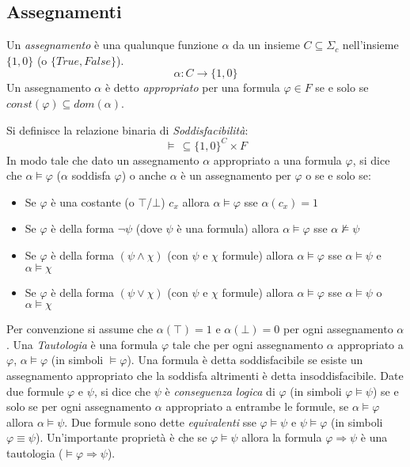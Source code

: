\documentclass[./main.tex]{subfiles}
\begin{document}



\subsection{Assegnamenti}

Un \textit{assegnamento} è una qualunque funzione $\alpha$ da un 
insieme $C \subseteq \Sigma_c$ nell'insieme $\{1, 0\}$ (o $\{True, False\}$).
$$ \alpha : C \rightarrow \{1, 0\} $$
Un assegnamento $\alpha$ è detto \textit{appropriato}  per una formula $\varphi \in F$ se e solo se $const(\varphi) \subseteq dom(\alpha)$.

Si definisce la relazione binaria di \textit{Soddisfacibilità}: 
$$\models \, \subseteq \{1, 0\}^{C} \times F$$
In modo tale che dato un assegnamento $\alpha$ appropriato a una formula $\varphi$, si dice che $\alpha \models \varphi$ ($\alpha$ soddisfa $\varphi$) 
o anche $\alpha$ è un assegnamento per $\varphi$ o  se e solo se:

\begin{itemize}
  \item Se $\varphi$ è una costante (o $\top$/$\bot$) $c_x$ allora $\alpha \models \varphi$ sse $\alpha(c_x) = 1$
  \item Se $\varphi$ è della forma $\lnot \psi$ (dove $\psi$ è una formula) allora $\alpha \models \varphi$ sse $\alpha \not\models \psi$
  \item Se $\varphi$ è della forma $(\psi \land \chi)$ (con $\psi$ e $\chi$ formule) allora $\alpha \models \varphi$ sse $\alpha \models \psi$ e $\alpha \models \chi$
  \item Se $\varphi$ è della forma $(\psi \lor \chi)$ (con $\psi$ e $\chi$ formule) allora $\alpha \models \varphi$ sse $\alpha \models \psi$ o $\alpha \models \chi$
\end{itemize}

Per convenzione si assume che $\alpha(\top) = 1$ e $\alpha(\bot) = 0$ per ogni assegnamento $\alpha$.
Una \textit{Tautologia} è una formula $\varphi$ tale che per ogni assegnamento $\alpha$ appropriato a $\varphi$, $\alpha \models \varphi$ (in simboli $\models \varphi$).
Una formula è detta soddisfacibile se esiste un assegnamento appropriato che la soddisfa altrimenti è detta insoddisfacibile.
Date due formule $\varphi$ e $\psi$, si dice che $\psi$ è \textit{conseguenza logica} di $\varphi$ (in simboli $\varphi \models \psi$) 
se e solo se per ogni assegnamento $\alpha$ appropriato a entrambe le formule, se $\alpha \models \varphi$ allora $\alpha \models \psi$.
Due formule sono dette \textit{equivalenti} sse $\varphi \models \psi$ e $\psi \models \varphi$ (in simboli $\varphi \equiv \psi$).
Un'importante proprietà è che se $\varphi \models \psi$ allora la formula $\varphi \Rightarrow \psi$ 
è una tautologia ($\models \varphi \Rightarrow \psi$).
\end{document}
